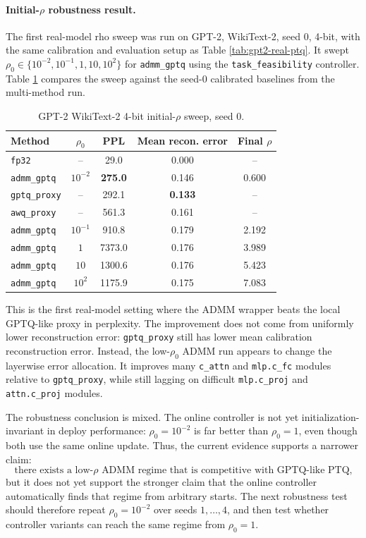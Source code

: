 \documentclass[11pt]{article}
\begin{document}
\paragraph{Initial-\(\rho\) robustness result.}
The first real-model rho sweep was run on GPT-2, WikiText-2, seed 0, 4-bit,
with the same calibration and evaluation setup as Table
\ref{tab:gpt2-real-ptq}.  It swept
\(\rho_0\in\{10^{-2},10^{-1},1,10,10^2\}\) for \texttt{admm\_gptq} using the
\texttt{task\_feasibility} controller.  Table
\ref{tab:gpt2-rho0-sweep} compares the sweep against the seed-0 calibrated
baselines from the multi-method run.

\begin{table}[h]
\centering
\caption{GPT-2 WikiText-2 4-bit initial-\(\rho\) sweep, seed 0.}
\label{tab:gpt2-rho0-sweep}
\begin{tabular}{lcccc}
\toprule
Method & \(\rho_0\) & PPL & Mean recon. error & Final \(\rho\)\\
\midrule
\texttt{fp32} & -- & 29.0 & 0.000 & --\\
\texttt{admm\_gptq} & \(10^{-2}\) & \textbf{275.0} & 0.146 & 0.600\\
\texttt{gptq\_proxy} & -- & 292.1 & \textbf{0.133} & --\\
\texttt{awq\_proxy} & -- & 561.3 & 0.161 & --\\
\texttt{admm\_gptq} & \(10^{-1}\) & 910.8 & 0.179 & 2.192\\
\texttt{admm\_gptq} & \(1\) & 7373.0 & 0.176 & 3.989\\
\texttt{admm\_gptq} & \(10\) & 1300.6 & 0.176 & 5.423\\
\texttt{admm\_gptq} & \(10^2\) & 1175.9 & 0.175 & 7.083\\
\bottomrule
\end{tabular}
\end{table}

This is the first real-model setting where the ADMM wrapper beats the local
GPTQ-like proxy in perplexity.  The improvement does not come from uniformly
lower reconstruction error: \texttt{gptq\_proxy} still has lower mean
calibration reconstruction error.  Instead, the low-\(\rho_0\) ADMM run appears
to change the layerwise error allocation.  It improves many \texttt{c\_attn}
and \texttt{mlp.c\_fc} modules relative to \texttt{gptq\_proxy}, while still
lagging on difficult \texttt{mlp.c\_proj} and \texttt{attn.c\_proj} modules.

The robustness conclusion is mixed.  The online controller is not yet
initialization-invariant in deploy performance: \(\rho_0=10^{-2}\) is far
better than \(\rho_0=1\), even though both use the same online update.  Thus,
the current evidence supports a narrower claim:
\[
    \text{there exists a low-}\rho\text{ ADMM regime that is competitive with
    GPTQ-like PTQ,}
\]
but it does not yet support the stronger claim that the online controller
automatically finds that regime from arbitrary starts.  The next robustness
test should therefore repeat \(\rho_0=10^{-2}\) over seeds \(1,\ldots,4\), and
then test whether controller variants can reach the same regime from
\(\rho_0=1\).
\end{document}
